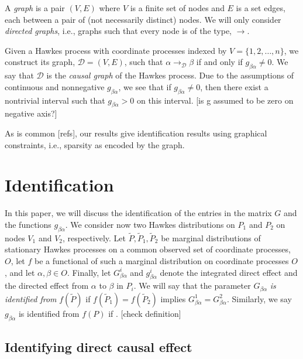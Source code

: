 \documentclass[accepted]{uai2021} %
\begin{document}
A {\it graph} is a pair $(V,E)$ where $V$ is a finite set of nodes and $E$ is a 
set edges, each between a pair of (not necessarily distinct) nodes. We will 
only consider {\it directed graphs}, i.e., graphs such that every node is of 
the type, $\rightarrow$.

Given a Hawkes process with coordinate processes indexed by $V = 
\{1,2,\ldots,n\}$, we construct its graph, $\mathcal{D} = (V,E)$, such that 
$\alpha \rightarrow_\mathcal{D} \beta$ if and only if $g_{\beta\alpha} \neq 0$. 
We say that $\mathcal{D}$ is the {\it causal graph} of the Hawkes process. Due 
to the assumptions of continuous and nonnegative $g_{\beta\alpha}$, we see 
that if $g_{\beta\alpha}\neq 0$, then there exist a nontrivial interval such 
that $g_{\beta\alpha} > 0$ on this interval. [is g assumed to be zero on 
negative axis?]

As is common [refs], our results give identification results using graphical 
constraints, i.e., sparsity as encoded by the graph.



\section{Identification}

In this paper, we will discuss the identification of the entries in the 
matrix $G$ and the functions $g_{\beta\alpha}$. We consider now two Hawkes 
distributions on $P_1$ and $P_2$ on nodes $V_1$ and $V_2$, respectively. Let 
$\tilde{P}, \tilde{P}_1, \tilde{P}_2$ be marginal 
distributions of stationary Hawkes processes on a common observed set of 
coordinate processes, $O$, let $f$ be a functional of 
such a marginal distribution on coordinate processes $O$, and let 
$\alpha,\beta\in O$. Finally, let $G_{\beta\alpha}^i$ and $g_{\beta\alpha}^i$ 
denote the integrated direct effect and the directed effect from $\alpha$ to 
$\beta$ in $P_i$. We will say that the parameter $G_{\beta\alpha}$ \emph{is 
identified from} 
$f(\tilde{P})$ if $f(\tilde{P}_1) = f(\tilde{P}_2)$ 
implies $G_{\beta\alpha}^1 = G_{\beta\alpha}^2$. Similarly, we say 
$g_{\beta\alpha}$ is identified from $f(P)$ if . [check definition]


\subsection{Identifying direct causal effect}
\end{document}
